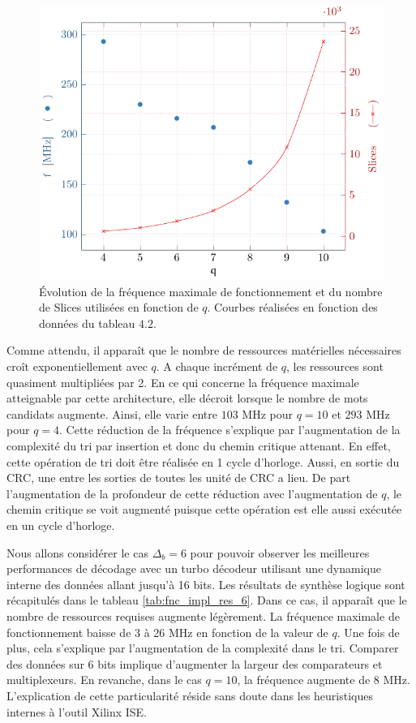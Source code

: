 \begin{figure}[!hbt]
	\centering
	\includegraphics{main/ch4_fig/implem/xc6_4.pdf}
	\caption{Évolution de la fréquence maximale de fonctionnement et du nombre de Slices utilisées en fonction de $q$.
	Courbes réalisées en fonction des données du tableau $4.2$. \label{fig:fnc_impl_res}}
\end{figure}

Comme attendu, il apparaît que le nombre de ressources matérielles nécessaires croît exponentiellement avec $q$. 
A chaque incrément
de $q$, les ressources sont quasiment multipliées par 2. En ce qui concerne la fréquence maximale atteignable par cette 
architecture, elle décroit lorsque le nombre de mots candidats augmente. Ainsi, elle varie entre $103$ MHz pour $q=10$ 
et $293$ MHz pour $q=4$. Cette réduction de la fréquence s'explique par l'augmentation de la complexité du tri par insertion
et donc du chemin critique attenant. En effet, cette opération de tri doit être réalisée en 1 cycle d'horloge. Aussi, en 
sortie du CRC, une  entre les sorties de toutes les unité de CRC a lieu. De part l'augmentation de
la profondeur de cette réduction avec l'augmentation de $q$, le chemin critique se voit augmenté puisque cette opération 
est elle aussi exécutée en un cycle d'horloge.

Nous allons considérer le cas $\Delta_b = 6$ pour pouvoir observer les meilleures performances de décodage avec un turbo décodeur 
utilisant une dynamique interne des données allant jusqu'à 16 bits. Les résultats de synthèse logique sont récapitulés dans le
tableau \ref{tab:fnc_impl_res_6}. Dans ce cas, il apparaît que le nombre de ressources requises augmente légèrement. La 
fréquence maximale de fonctionnement baisse de 3 à 26 MHz en fonction de la valeur de $q$. Une fois de plus, cela 
s'explique par l'augmentation de la complexité dans le tri. Comparer des données sur 6 bits implique d'augmenter la 
largeur des comparateurs et multiplexeurs. En revanche, dans le cas 
$q=10$, la fréquence augmente de 8 MHz. L'explication de cette particularité réside sans doute dans 
les heuristiques internes à l'outil Xilinx ISE. 

